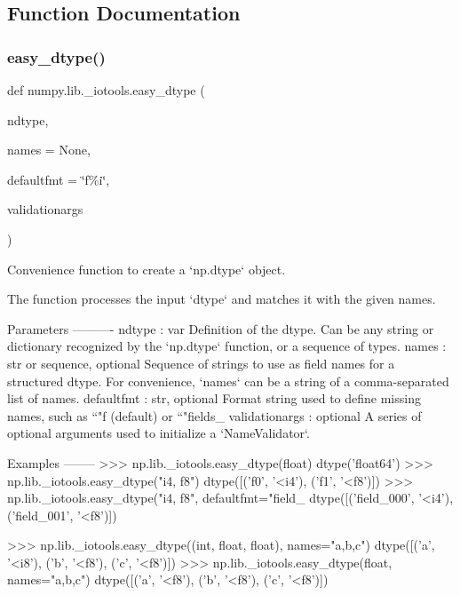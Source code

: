 \subsection{Function Documentation}
\mbox{\label{namespacenumpy_1_1lib_1_1__iotools_ac490a3a791ed204e47c9c50f704ac40e}} 
\subsubsection{\texorpdfstring{easy\+\_\+dtype()}{easy\_dtype()}}
{\footnotesize\ttfamily def numpy.\+lib.\+\_\+iotools.\+easy\+\_\+dtype (\begin{DoxyParamCaption}\item[{}]{ndtype,  }\item[{}]{names = {\ttfamily None},  }\item[{}]{defaultfmt = {\ttfamily \char`\"{}f\%i\char`\"{}},  }\item[{}]{validationargs }\end{DoxyParamCaption})}

\begin{DoxyVerb}Convenience function to create a `np.dtype` object.

The function processes the input `dtype` and matches it with the given
names.

Parameters
----------
ndtype : var
    Definition of the dtype. Can be any string or dictionary recognized
    by the `np.dtype` function, or a sequence of types.
names : str or sequence, optional
    Sequence of strings to use as field names for a structured dtype.
    For convenience, `names` can be a string of a comma-separated list
    of names.
defaultfmt : str, optional
    Format string used to define missing names, such as ``"f%
    (default) or ``"fields_%
validationargs : optional
    A series of optional arguments used to initialize a
    `NameValidator`.

Examples
--------
>>> np.lib._iotools.easy_dtype(float)
dtype('float64')
>>> np.lib._iotools.easy_dtype("i4, f8")
dtype([('f0', '<i4'), ('f1', '<f8')])
>>> np.lib._iotools.easy_dtype("i4, f8", defaultfmt="field_%
dtype([('field_000', '<i4'), ('field_001', '<f8')])

>>> np.lib._iotools.easy_dtype((int, float, float), names="a,b,c")
dtype([('a', '<i8'), ('b', '<f8'), ('c', '<f8')])
>>> np.lib._iotools.easy_dtype(float, names="a,b,c")
dtype([('a', '<f8'), ('b', '<f8'), ('c', '<f8')])\end{DoxyVerb}
 \mbox{\label{namespacenumpy_1_1lib_1_1__iotools_ae64e910fdeae338f1f962ff03efb841e}} 
